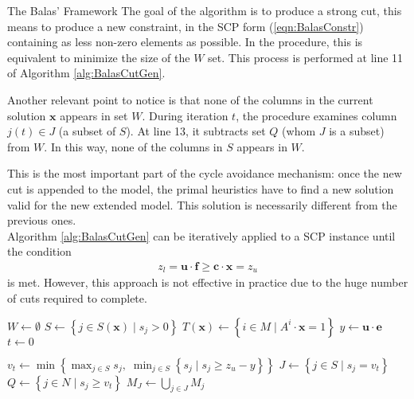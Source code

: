 \documentclass[a4paper,12pt]{mydeitesi_eng}
\begin{document}
\begin{chapter}{The Balas' Framework}
The goal of the algorithm is to produce a strong cut, this means to produce a new constraint, in the SCP form (\ref{eqn:BalasConstr}) containing as less non-zero elements as possible.
In the procedure, this is equivalent to minimize the size of the $W$ set.
This process is performed at line 11 of Algorithm \ref{alg:BalasCutGen}.

Another relevant point to notice is that none of the columns in the current solution $\mathbf{x}$ appears in set $W$.
During iteration $t$, the procedure examines column $j(t) \in J$ (a subset of $S$).
At line 13, it subtracts set $Q$ (whom $J$ is a subset) from $W$.
In this way, none of the columns in $S$ appears in $W$.

This is the most important part of the cycle avoidance mechanism: once the new cut is appended to the model, the primal heuristics have to find a new solution valid for the new extended model.
This solution is necessarily different from the previous ones.\\

Algorithm \ref{alg:BalasCutGen} can be iteratively applied to a SCP instance until the condition
\begin{align}
z_l = \mathbf{u \cdot f} \geq \mathbf{c \cdot x} = z_u
\label{eqn:PrimalDualCond}
\end{align}
is met.
However, this approach is not effective in practice due to the huge number of cuts required to complete.\\

\begin{algorithm}[h]
\AlgoDontDisplayBlockMarkers
\SetAlgoNoEnd
\DontPrintSemicolon
\LinesNumbered


\BlankLine

$W \gets \emptyset$\;
$S \gets \left\{ j \in S(\mathbf{x}) \mid s_j > 0 \right\}$\;
$T(\mathbf{x}) \gets \left\{ i \in M \mid A^i \cdot \mathbf{x} = 1 \right\}$\;
$y \gets \mathbf{u} \cdot \mathbf{e}$\;
$t \gets 0$\;

{
	$v_t \gets \min \left\{ \max_{j\in S} s_j,\; \min_{j\in S} \left\{ s_j \mid s_j \ge z_u - y \right\} \right\}$\;
	$J \gets \left\{ j \in S \mid s_j = v_t \right\}$\;
	$Q \gets \left\{ j \in N \mid s_j \ge v_t \right\}$\;
	$M_J \gets \bigcup_{j \in J} M_j $\;
	
}
\end{algorithm}
\end{chapter}
\end{document}
